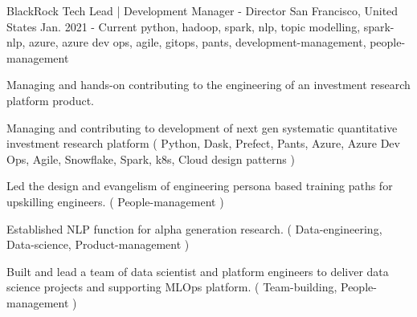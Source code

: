 \cventry
    {BlackRock} %
    {Tech Lead | Development Manager - Director} %
    {San Francisco, United States} %
    {Jan. 2021 - Current} %
    { python, hadoop, spark, nlp, topic modelling, spark-nlp, azure, azure dev ops, agile, gitops, pants, development-management, people-management} %
    {
       Managing and hands-on contributing to the engineering of an investment research platform product.
    \begin{cvitems} %
       \item { Managing and contributing to development of next gen systematic quantitative investment research platform ( Python, Dask, Prefect, Pants, Azure, Azure Dev Ops, Agile, Snowflake, Spark, k8s, Cloud design patterns ) }
       \item { Led the design and evangelism of engineering persona based training paths for upskilling engineers. ( People-management ) }
       \item { Established NLP function for alpha generation research. ( Data-engineering, Data-science, Product-management ) }
       \item { Built and lead a team of data scientist and platform engineers to deliver data science projects and supporting MLOps platform. ( Team-building, People-management ) }
    \end{cvitems}
    }
